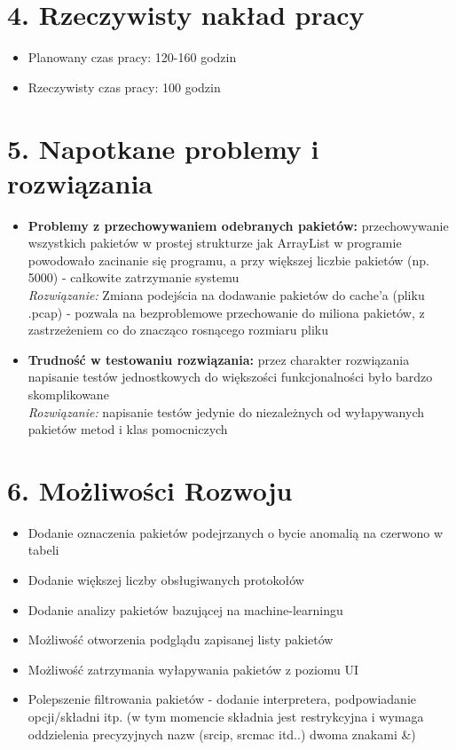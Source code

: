 \documentclass[a4paper,12pt]{article}
\begin{document}
\section*{4. Rzeczywisty nakład pracy}

\begin{itemize}
    \item Planowany czas pracy: 120-160 godzin
    \item Rzeczywisty czas pracy: 100 godzin
\end{itemize}

\section*{5. Napotkane problemy i rozwiązania}

\begin{itemize}
    \item \textbf{Problemy z przechowywaniem odebranych pakietów:} przechowywanie wszystkich pakietów w prostej strukturze jak ArrayList w programie powodowało zacinanie się programu, a przy większej liczbie pakietów (np. 5000) - całkowite zatrzymanie systemu\\
    \textit{Rozwiązanie:} Zmiana podejścia na dodawanie pakietów do cache'a (pliku .pcap) - pozwala na bezproblemowe przechowanie do miliona pakietów, z zastrzeżeniem co do znacząco rosnącego rozmiaru pliku

    \item \textbf{Trudność w testowaniu rozwiązania:} przez charakter rozwiązania napisanie testów jednostkowych do większości funkcjonalności było bardzo skomplikowane\\
    \textit{Rozwiązanie:} napisanie testów jedynie do niezależnych od wyłapywanych pakietów metod i klas pomocniczych
\end{itemize}

\section*{6. Możliwości Rozwoju}

\begin{itemize}
    \item Dodanie oznaczenia pakietów podejrzanych o bycie anomalią na czerwono w tabeli  
    \item Dodanie większej liczby obsługiwanych protokołów
    \item Dodanie analizy pakietów bazującej na machine-learningu
    \item Możliwość otworzenia podglądu zapisanej listy pakietów
    \item Możliwość zatrzymania wyłapywania pakietów z poziomu UI
    \item Polepszenie filtrowania pakietów - dodanie interpretera, podpowiadanie opcji/składni itp. (w tym momencie składnia jest restrykcyjna i wymaga oddzielenia precyzyjnych nazw (srcip, srcmac itd..) dwoma znakami \&)
\end{itemize}
\end{document}
